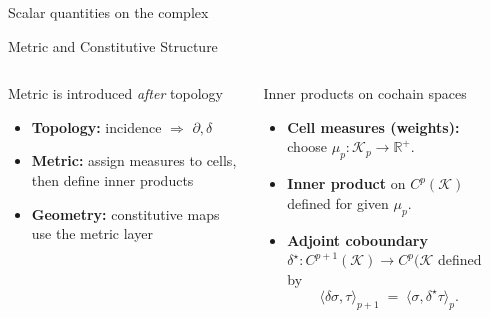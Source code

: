 \begin{frame}{Scalar quantities on the complex}
\begin{tikzpicture}[scale=1.35, every node/.style={font=\scriptsize}]
\end{tikzpicture}
\end{frame}

\begin{frame}{Metric and Constitutive Structure}
\begin{columns}[T,onlytextwidth]

\vspace{-0.7cm}
\begin{block}{\small Metric is introduced \emph{after} topology}
\begin{itemize}
\item \textbf{Topology:} incidence $\Rightarrow$ $\partial,\delta$
\item \textbf{Metric:} assign measures to cells, then define inner products
\item \textbf{Geometry:} constitutive maps use the metric layer
\end{itemize}
\end{block}

\begin{block}{\small Inner products on cochain spaces}
\begin{itemize}
\item \textbf{Cell measures (weights):} choose \(\mu_p:\mathcal{K}_p\to\mathbb{R}^+\).
\item \textbf{Inner product} on $C^p(\mathcal{K})$ defined for given $\mu_p$.
\item \textbf{Adjoint coboundary} $\delta^\star:C^{p+1}(\mathcal{K})\to C^p(\mathcal{K}$ defined by
\vspace{-0.8cm}
\[
\langle \delta\sigma,\tau\rangle_{p+1} \;=\; \langle \sigma,\delta^\star\tau\rangle_p .
\]
\end{itemize}
\end{block}

\begin{center}
\vspace{-0.8cm}
\end{center}
\end{columns}
\end{frame}
